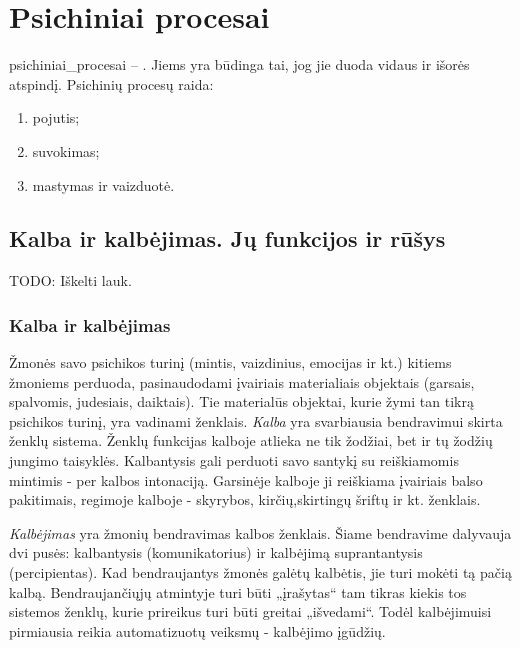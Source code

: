 \chapter{Psichiniai procesai}

\label{tema:psichiniai_procesai}

\Gls{psichiniai_procesai} – . Jiems yra 
būdinga tai, jog jie duoda vidaus ir išorės atspindį. Psichinių procesų
raida:
\begin{enumerate}
  \item \gls{pojutis};
  \item \gls{suvokimas};
  \item \gls{mastymas} ir vaizduotė.
\end{enumerate}

\section{Kalba ir kalbėjimas. Jų funkcijos ir rūšys}

TODO: Iškelti lauk.

\label{tema:kalba_ir_kalbejimas}

\subsection{Kalba ir kalbėjimas}

Žmonės savo psichikos turinį (mintis, vaizdinius, emocijas ir kt.)
kitiems žmoniems perduoda, pasinaudodami įvairiais materialiais objektais
(garsais, spalvomis, judesiais, daiktais). Tie materialūs objektai, kurie
žymi tan tikrą psichikos turinį, yra vadinami ženklais. \emph{Kalba} yra
svarbiausia bendravimui skirta ženklų sistema. Ženklų funkcijas kalboje
atlieka ne tik žodžiai, bet ir tų žodžių jungimo taisyklės. Kalbantysis 
gali perduoti savo santykį su reiškiamomis mintimis - per kalbos intonaciją.
Garsinėje kalboje ji reiškiama įvairiais balso pakitimais, regimoje kalboje
- skyrybos, kirčių,skirtingų šriftų ir kt. ženklais.

\emph{Kalbėjimas} yra žmonių bendravimas kalbos ženklais. Šiame bendravime
dalyvauja dvi pusės: kalbantysis (komunikatorius) ir kalbėjimą 
suprantantysis (percipientas). Kad bendraujantys žmonės galėtų kalbėtis, 
jie turi mokėti tą pačią kalbą. Bendraujančiųjų atmintyje turi būti 
„įrašytas“ tam tikras kiekis tos sistemos ženklų, kurie prireikus
turi būti greitai „išvedami“. Todėl kalbėjimuisi pirmiausia reikia 
automatizuotų veiksmų - kalbėjimo įgūdžių.


